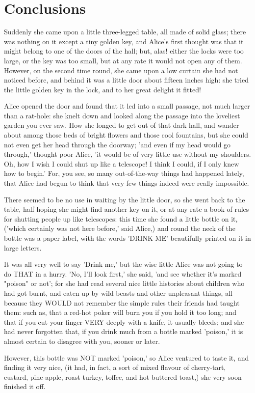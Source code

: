 \section{Conclusions}
\label{sec-conclusions}

Suddenly she came upon a little three-legged table, all made of solid
glass; there was nothing on it except a tiny golden key, and Alice's
first thought was that it might belong to one of the doors of the
hall; but, alas!
either the locks were too large, or the key was too small, but at any
rate it would not open any of them.
However, on the second time round, she came upon a low curtain she
had not noticed before, and behind it was a little door about fifteen
inches high: she tried the little golden key in the lock, and to her
great delight it fitted!

Alice opened the door and found that it led into a small passage, not
much larger than a rat-hole: she knelt down and looked along the
passage into the loveliest garden you ever saw.
How she longed to get out of that dark hall, and wander about among
those beds of bright flowers and those cool fountains, but she could
not even get her head through the doorway; 'and even if my head would
go through,' thought poor Alice, 'it would be of very little use
without my shoulders.
Oh, how I wish I could shut up like a telescope!
I think I could, if I only knew how to begin.'
For, you see, so many out-of-the-way things had happened lately, that
Alice had begun to think that very few things indeed were really
impossible.

There seemed to be no use in waiting by the little door, so she went
back to the table, half hoping she might find another key on it, or
at any rate a book of rules for shutting people up like telescopes:
this time she found a little bottle on it, ('which certainly was not
here before,' said Alice,) and round the neck of the bottle was a
paper label, with the words 'DRINK ME' beautifully printed on it in
large letters.

It was all very well to say 'Drink me,' but the wise little Alice was
not going to do THAT in a hurry. 'No, I'll look first,' she said, 'and
see whether it's marked "poison" or not'; for she had read several nice
little histories about children who had got burnt, and eaten up by wild
beasts and other unpleasant things, all because they WOULD not remember
the simple rules their friends had taught them: such as, that a red-hot
poker will burn you if you hold it too long; and that if you cut your
finger VERY deeply with a knife, it usually bleeds; and she had never
forgotten that, if you drink much from a bottle marked 'poison,' it is
almost certain to disagree with you, sooner or later.

However, this bottle was NOT marked 'poison,' so Alice ventured to
taste it, and finding it very nice, (it had, in fact, a sort of mixed
flavour of cherry-tart, custard, pine-apple, roast turkey, toffee,
and hot buttered toast,) she very soon finished it off.
